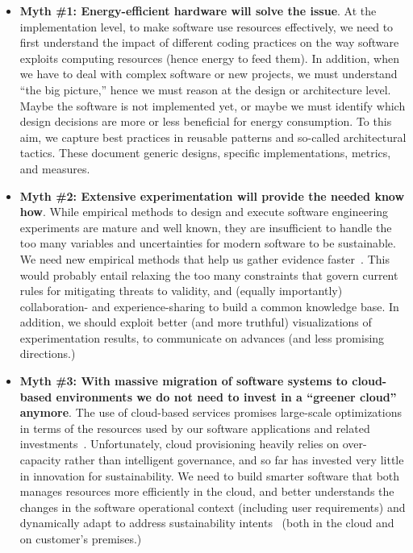 \documentclass[11pt, oneside]{amsart}
\begin{document}
\begin{itemize}
\item[] {\bf Myth \#1: Energy-efficient hardware will solve the issue}. At the implementation level, to make software use resources effectively, we need to first understand the impact of different coding practices on the way software exploits computing resources (hence energy to feed them). In addition, when we have to deal with complex software or new projects, we must understand ``the big picture,'' hence we must reason at the design or architecture level. Maybe the software is not implemented yet, or maybe we must identify which design decisions are more or less beneficial for energy consumption. To this aim, we capture best practices in reusable patterns and so-called architectural tactics. These document generic designs, specific implementations, metrics, and measures.\\

\item[] {\bf Myth \#2: Extensive experimentation will provide the needed know how}. While empirical methods to design and execute software engineering experiments are mature and well known, they are insufficient to handle the too many variables and uncertainties for modern software to be sustainable. We need new empirical methods that help us gather evidence faster~\cite{Procaccianti2015}. This would probably entail relaxing the too many constraints that govern current rules for mitigating threats to validity, and (equally importantly) collaboration- and experience-sharing to build a common knowledge base. In addition, we should exploit better (and more truthful) visualizations of experimentation results, to communicate on advances (and less promising directions.)\\

\item[] {\bf Myth \#3: With massive migration of software systems to cloud-based environments we do not need to invest in a ``greener cloud'' anymore}. The use of cloud-based services promises large-scale optimizations in terms of the resources used by our software applications and related investments~\cite{green-cloud-sw}. Unfortunately, cloud provisioning heavily relies on over-capacity rather than intelligent governance, and so far has invested very little in innovation for sustainability. We need to build smarter software that both manages resources more efficiently in the cloud, and better understands the changes in the software operational context (including user requirements) and dynamically adapt to address sustainability intents~\cite{Procaccianti2016-2} (both in the cloud and on customer's premises.)\\

\end{itemize}
\end{document}
